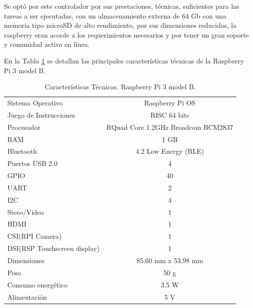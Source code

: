\begin{itemize}
    Se optó por este controlador por sus prestaciones,  t\'ecnicas, suficientes para las tareas a ser ejecutadas, con un almacenamiento externa de 64 Gb con una memoria tipo microSD de alto rendimiento, por sus dimensiones reducidas, la raspberry  eran acorde a los requerimientos necesarios y por tener un gran soporte y comunidad activa en l\'inea.
 
    En la Tabla \ref{tab:carac_rasp} se detallan las principales características técnicas de la Raspberry Pi 3 model B.
 
 \begin{table}[t]
      \protect\caption[Características Técnicas. Raspberry Pi 3 model B]{Características Técnicas. Raspberry Pi 3 model B.  \label{tab:carac_rasp}}
    
     \centering
     \begin{tabular}{l c}
        \toprule
           Sistema Operativo & Raspberry Pi OS\\
          Juego de Instrucciones & RISC 64 bits\\
          Procesador & RQuad Core 1.2GHz Broadcom BCM2837\\
          RAM  & 1 GB\\
          Bluetooth &  4.2 Low Energy (BLE)\\
          Puertos USB 2.0 & 4\\
          GPIO& 40\\
          UART& 2\\
          I2C& 4\\
          Stero/Video & 1\\
          HDMI & 1\\
          CSI(RPI Camera) & 1\\
          DSI(RSP Touchscreen display) & 1\\
          Dimensiones & 85.60 mm x 53.98 mm\\
          Peso & 50 g\\
          Consumo energ\'etico & 3.5 W\\
          Alimentaci\'on & 5 V\\
     \bottomrule   
     \end{tabular}
     \vspace{5mm}

\end{table}
\end{itemize}
